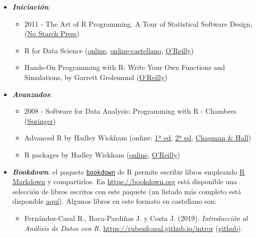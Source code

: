 \documentclass[
]{book}
\providecommand{\tightlist}{%
  \setlength{\itemsep}{0pt}\setlength{\parskip}{0pt}}
\theoremstyle{break}
\theoremstyle{definition}
\theoremstyle{definition}
\theoremstyle{definition}
\theoremstyle{definition}
\theoremstyle{remark}
\begin{document}
\begin{itemize}
\item
  \textbf{\emph{Iniciación}}:

  \begin{itemize}
  \item
    2011 - The Art of R Programming. A Tour of Statistical Software Design,
    (\href{https://www.nostarch.com/artofr.htm}{No Starch Press})
  \item
    R for Data Science
    (\href{http://r4ds.had.co.nz}{online}, \href{https://es.r4ds.hadley.nz}{online-castellano},
    \href{http://shop.oreilly.com/product/0636920034407.do}{O'Reilly})
  \item
    Hands-On Programming with R: Write Your Own Functions and Simulations,
    by Garrett Grolemund
    (\href{http://shop.oreilly.com/product/0636920028574.do}{O'Reilly})
  \end{itemize}
\item
  \textbf{\emph{Avanzados}}:

  \begin{itemize}
  \item
    2008 - Software for Data Analysis: Programming with R - Chambers
    (\href{http://www.springer.com/la/book/9780387759357}{Springer})
  \item
    Advanced R by Hadley Wickham
    (online: \href{http://adv-r.had.co.nz/}{1ª ed},
    \href{https://adv-r.hadley.nz/}{2ª ed},
    \href{https://www.amazon.com/dp/1466586966}{Chapman \& Hall})
  \item
    R packages by Hadley Wickham
    (\href{http://r-pkgs.had.co.nz/}{online},
    \href{http://shop.oreilly.com/product/0636920034421.do}{O'Reilly})
  \end{itemize}
\item
  \textbf{\emph{Bookdown}}:
  el paquete \href{https://bookdown.org}{\texttt{bookdown}} de R permite escribir libros empleando
  \href{http://rmarkdown.rstudio.com}{R Markdown} y compartirlos.
  En \url{https://bookdown.org} está disponible una selección de libros escritos con este paquete
  (un listado más completo está disponible \href{https://bookdown.org/home/archive/}{aquí}).
  Algunos libros en este formato en castellano son:

  \begin{itemize}
  \tightlist
  \item
    Fernández-Casal R., Roca-Pardiñas J. y Costa J. (2019). \emph{Introducción al Análisis de Datos con R}. \url{https://rubenfcasal.github.io/intror} (\href{https://github.com/rubenfcasal/intror}{github}).
  \end{itemize}


\end{itemize}
\end{document}

